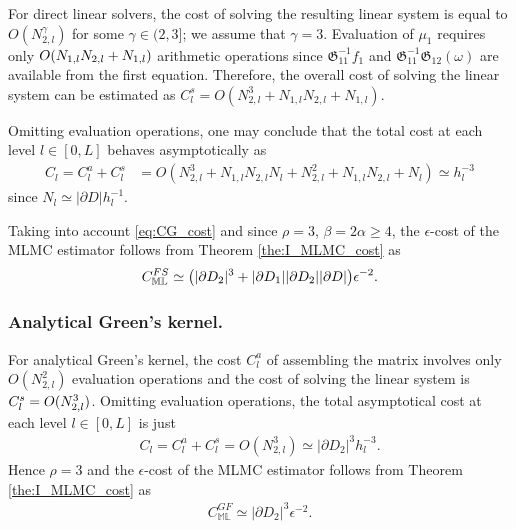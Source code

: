 For direct linear solvers, the cost of solving the resulting linear system is equal to $O(N_{2,l}^{\gamma})$ for some $\gamma \in (2,3]$; we assume that $\gamma = 3$.
Evaluation of $\mu_1$ requires only $O(N_{1,l}N_{2,l}+N_{1,l})$ arithmetic operations since $\boldsymbol{\mathfrak{G}}_{11}^{-1} f_1$ and $\boldsymbol{\mathfrak{G}}_{11}^{-1} \boldsymbol{\mathfrak{G}}_{12}(\omega)$ are available from the first equation.
Therefore, the overall cost of solving the linear system can be estimated as $C_l^s = O( N_{2,l}^3 + N_{1,l}N_{2,l} + N_{1,l} )$.

Omitting evaluation operations, one may conclude that the total cost at each level $l \in [0,L]$ behaves asymptotically as
\begin{align}\label{eq:CG_cost}
	{C_l} = C_l^a + C_l^{s} &= O \left( N_{2,l}^3 +  N_{1,l} N_{2,l} N_{l} + N_{2,l}^2 + N_{1,l}N_{2,l} + N_{l}\right)
	\simeq  h_l^{-3}
\end{align}
since $N_l \simeq |\partial D| h_l^{-1}$.

Taking into account \eqref{eq:CG_cost} and since $\rho=3$, $\beta=2\alpha\geq 4$, the $\epsilon$-cost of the MLMC estimator follows from Theorem \ref{the:I_MLMC_cost} as 
\begin{align}\label{eq:MLMC_cost}
	C_{\mathbb{ML}}^{FS}
	\simeq
	\big( |\partial D_2|^3 + |\partial D_1| |\partial D_2| |\partial D| \big) \epsilon^{-2}.
\end{align}


\subsubsection{Analytical Green's kernel.}
\label{sec:anGF_complexity}

For analytical Green's kernel, the cost $C_{l}^a$ of assembling the matrix involves only $O(N_{2,l}^2)$ evaluation operations and the cost of solving the linear system is $C_l^s = O(N_{2,l}^{3})$.
Omitting evaluation operations, the total asymptotical cost at each level $l \in [0,L]$ is just
\begin{align}\label{eq:cost_anal}
	C_l = C_l^a + C_l^{s} = O \left(  N_{2,l}^3 \right)
	\simeq |\partial D_2|^{3} h_l^{-3}.
\end{align}
Hence $\rho=3$ and the $\epsilon$-cost of the MLMC estimator follows from Theorem \ref{the:I_MLMC_cost} as
\begin{align}\label{eq:MLMC_cost_anGF}
	C_{\mathbb{ML}}^{GF}
	\simeq
	|\partial D_2|^3 \epsilon^{-2}.
\end{align}


